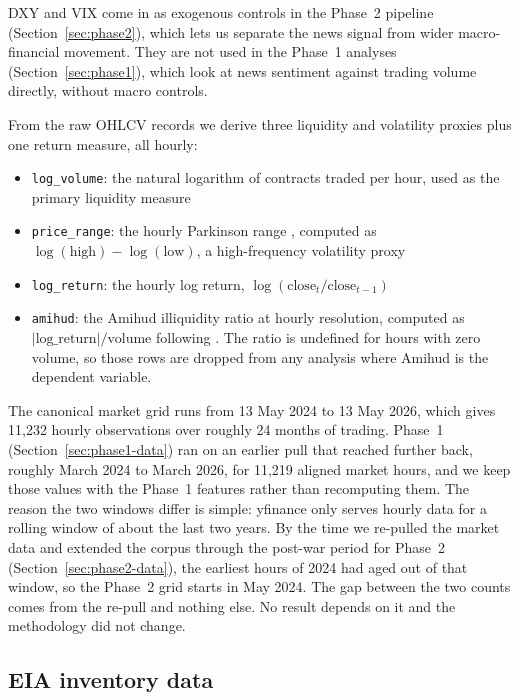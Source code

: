 DXY and VIX come in as exogenous controls in the Phase~2 pipeline (Section~\ref{sec:phase2}), which lets us separate the news signal from wider macro-financial movement. They are not used in the Phase~1 analyses (Section~\ref{sec:phase1}), which look at news sentiment against trading volume directly, without macro controls.

From the raw OHLCV records we derive three liquidity and volatility proxies plus one return measure, all hourly:

\begin{itemize}
  \item \texttt{log\_volume}: the natural logarithm of contracts traded per hour, used as the primary liquidity measure
  \item \texttt{price\_range}: the hourly Parkinson range \citep{parkinson1980}, computed as $\log(\text{high}) - \log(\text{low})$, a high-frequency volatility proxy
  \item \texttt{log\_return}: the hourly log return, $\log(\text{close}_t / \text{close}_{t-1})$
  \item \texttt{amihud}: the Amihud illiquidity ratio at hourly resolution, computed as $\lvert \text{log\_return} \rvert / \text{volume}$ following \citet{amihud2002}. The ratio is undefined for hours with zero volume, so those rows are dropped from any analysis where Amihud is the dependent variable.
\end{itemize}

The canonical market grid runs from 13 May 2024 to 13 May 2026, which gives 11{,}232 hourly observations over roughly 24 months of trading. Phase~1 (Section~\ref{sec:phase1-data}) ran on an earlier pull that reached further back, roughly March 2024 to March 2026, for 11{,}219 aligned market hours, and we keep those values with the Phase~1 features rather than recomputing them. The reason the two windows differ is simple: yfinance only serves hourly data for a rolling window of about the last two years. By the time we re-pulled the market data and extended the corpus through the post-war period for Phase~2 (Section~\ref{sec:phase2-data}), the earliest hours of 2024 had aged out of that window, so the Phase~2 grid starts in May 2024. The gap between the two counts comes from the re-pull and nothing else. No result depends on it and the methodology did not change.

\subsection{EIA inventory data}\label{sec:eia-data}

